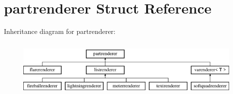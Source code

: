 \hypertarget{structpartrenderer}{}\section{partrenderer Struct Reference}
\label{structpartrenderer}
Inheritance diagram for partrenderer\+:\begin{figure}[H]
\begin{center}
\leavevmode
\includegraphics[height=2.871795cm]{structpartrenderer}
\end{center}
\end{figure}
